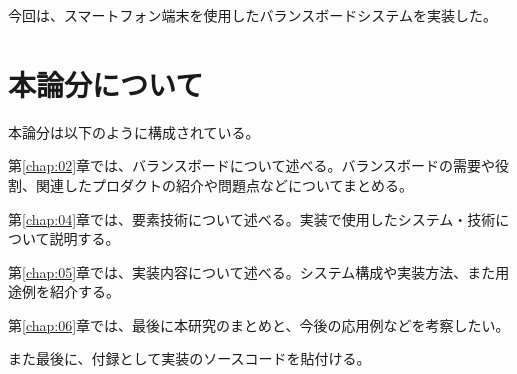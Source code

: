今回は、スマートフォン端末を使用したバランスボードシステムを実装した。



\section{本論分について}

本論分は以下のように構成されている。

第\ref{chap:02}章では、バランスボードについて述べる。バランスボードの需要や役割、関連したプロダクトの紹介や問題点などについてまとめる。


第\ref{chap:04}章では、要素技術について述べる。実装で使用したシステム・技術について説明する。

第\ref{chap:05}章では、実装内容について述べる。システム構成や実装方法、また用途例を紹介する。

第\ref{chap:06}章では、最後に本研究のまとめと、今後の応用例などを考察したい。

また最後に、付録として実装のソースコードを貼付ける。
